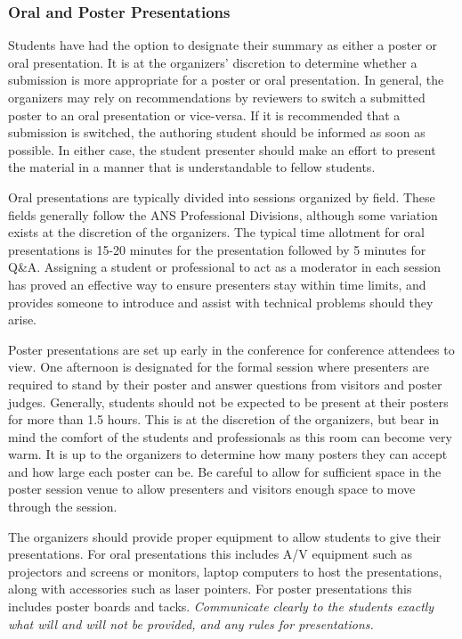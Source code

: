 \documentclass[12pt]{article}
\begin{document}
\subsubsection{Oral and Poster Presentations}
Students have had the option to designate their summary as either a poster or oral presentation.
It is at the organizers' discretion to determine whether a submission is more appropriate for a poster or oral presentation.
In general, the organizers may rely on recommendations by reviewers to switch a submitted poster to an oral presentation or vice-versa. If it is recommended that a submission is switched, the authoring student should be informed as soon as possible.
In either case, the student presenter should make an effort to present the material in a manner that is understandable to fellow students.

Oral presentations are typically divided into sessions organized by field.
These fields generally follow the ANS Professional Divisions, although some variation exists at the discretion of the organizers.
The typical time allotment for oral presentations is 15-20 minutes for the presentation followed by 5 minutes for Q\&A.
Assigning a student or professional to act as a moderator in each session has proved an effective way to ensure presenters stay within time limits, and provides someone to introduce and assist with technical problems should they arise.

Poster presentations are set up early in the conference for conference attendees to view.
One afternoon is designated for the formal session where presenters are required to stand by their poster and answer questions from visitors and poster judges.
Generally, students should not be expected to be present at their posters for more than 1.5 hours.
This is at the discretion of the organizers, but bear in mind the comfort of the students and professionals as this room can become very warm.
It is up to the organizers to determine how many posters they can accept and how large each poster can be.
Be careful to allow for sufficient space in the poster session venue to allow presenters and visitors enough space to move through the session.

The organizers should provide proper equipment to allow students to give their presentations.
For oral presentations this includes A/V equipment such as projectors and screens or monitors, laptop computers to host the presentations, along with accessories such as laser pointers.
For poster presentations this includes poster boards and tacks.
\emph{Communicate clearly to the students exactly what will and will not be provided, and any rules for presentations.}
\end{document}

